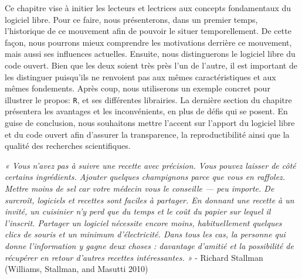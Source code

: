 \documentclass[
  letterpaper,
]{scrbook}
\begin{document}
Ce chapitre vise à initier les lecteurs et lectrices aux concepts
fondamentaux du logiciel libre. Pour ce faire, nous présenterons, dans
un premier temps, l'historique de ce mouvement afin de pouvoir le situer
temporellement. De cette façon, nous pourrons mieux comprendre les
motivations derrière ce mouvement, mais aussi ses influences actuelles.
Ensuite, nous distinguerons le logiciel libre du code ouvert. Bien que
les deux soient très près l'un de l'autre, il est important de les
distinguer puisqu'ils ne renvoient pas aux mêmes caractéristiques et aux
mêmes fondements. Après coup, nous utiliserons un exemple concret pour
illustrer le propos: \texttt{R}, et ses différentes librairies. La
dernière section du chapitre présentera les avantages et les
inconvénients, en plus de défis qui se posent. En guise de conclusion,
nous souhaitons mettre l'accent sur l'apport du logiciel libre et du
code ouvert afin d'assurer la transparence, la reproductibilité ainsi
que la qualité des recherches scientifiques.

\emph{« Vous n'avez pas à suivre une recette avec précision. Vous pouvez
laisser de côté certains ingrédients. Ajouter quelques champignons parce
que vous en raffolez. Mettre moins de sel car votre médecin vous le
conseille --- peu importe. De surcroît, logiciels et recettes sont
faciles à partager. En donnant une recette à un invité, un cuisinier n'y
perd que du temps et le coût du papier sur lequel il l'inscrit. Partager
un logiciel nécessite encore moins, habituellement quelques clics de
souris et un minimum d'électricité. Dans tous les cas, la personne qui
donne l'information y gagne deux choses : davantage d'amitié et la
possibilité de récupérer en retour d'autres recettes intéressantes. »} -
Richard Stallman (Williams, Stallman, and Masutti 2010)
\end{document}
